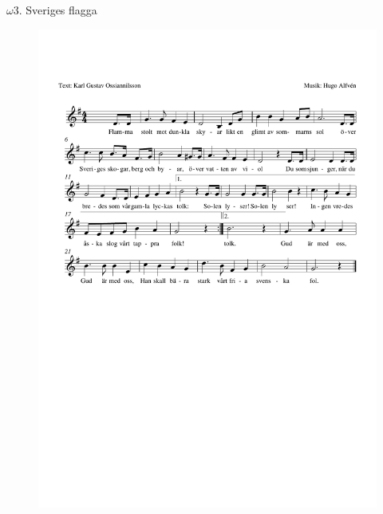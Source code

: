 \documentclass[a6paper,11pt]{article}
\begin{document}
\setlength{\oddsidemargin}{-0.47in}
\begin{center}
\Large$\omega 3$. Sveriges flagga
\end{center}
\vspace{-40pt}
\begin{figure}[!h]
\centering
\includegraphics[width=\textwidth]{sveriges-flagga}
\end{figure}
\end{document}
